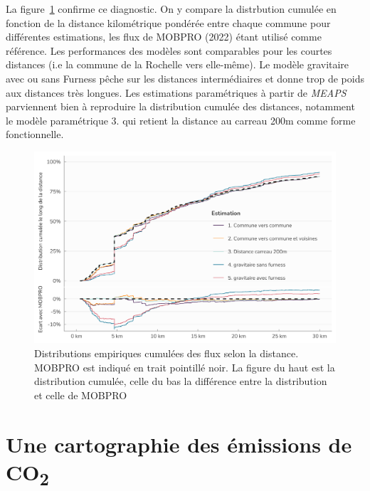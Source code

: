 \documentclass[
  10pt,
  a4paper,
  numbers=noendperiod,
  DIV=9]{scrreprt}
\begin{document}
La figure~\ref{fig-distrdist} confirme ce diagnostic. On y compare la
distrbution cumulée en fonction de la distance kilométrique pondérée
entre chaque commune pour différentes estimations, les flux de MOBPRO
(2022) étant utilisé comme référence. Les performances des modèles sont
comparables pour les courtes distances (i.e la commune de la Rochelle
vers elle-même). Le modèle gravitaire avec ou sans Furness pêche sur les
distances intermédiaires et donne trop de poids aux distances très
longues. Les estimations paramétriques à partir de \emph{MEAPS}
parviennent bien à reproduire la distribution cumulée des distances,
notamment le modèle paramétrique 3. qui retient la distance au carreau
200m comme forme fonctionnelle.

\begin{figure}[htb]

{\centering \includegraphics[width=1\textwidth,height=\textheight]{./larochelle_files/figure-pdf/fig-distrdist-1.png}

}

\caption[Distributions empiriques cumulées des
distances]{\label{fig-distrdist}Distributions empiriques cumulées des
flux selon la distance. MOBPRO est indiqué en trait pointillé noir. La
figure du haut est la distribution cumulée, celle du bas la différence
entre la distribution et celle de MOBPRO}

\end{figure}

\hypertarget{une-cartographie-des-uxe9missions-de-co2}{%
\section{\texorpdfstring{Une cartographie des émissions de
CO\textsubscript{2}}{Une cartographie des émissions de CO2}}\label{une-cartographie-des-uxe9missions-de-co2}}
\end{document}
